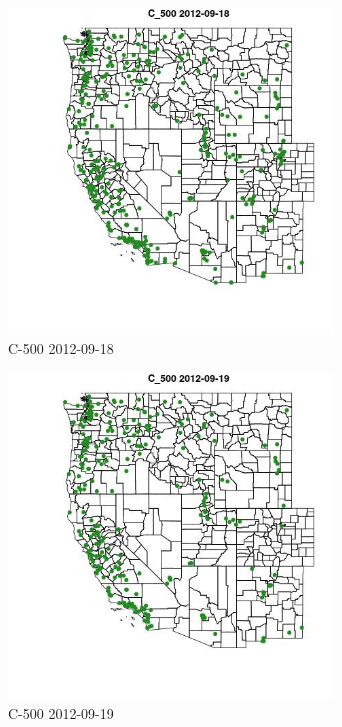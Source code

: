 \begin{figure} 
\centering  
\includegraphics[width=0.77\textwidth]{Code_Outputs/ML_input_report_ML_input_PM25_Step5_part_d_de_duplicated_aves_ML_input_MapObsC_5002012-09-18.jpg} 
\caption{\label{fig:ML_input_report_ML_input_PM25_Step5_part_d_de_duplicated_aves_ML_inputMapObsC_5002012-09-18}C-500 2012-09-18} 
\end{figure} 
 

\begin{figure} 
\centering  
\includegraphics[width=0.77\textwidth]{Code_Outputs/ML_input_report_ML_input_PM25_Step5_part_d_de_duplicated_aves_ML_input_MapObsC_5002012-09-19.jpg} 
\caption{\label{fig:ML_input_report_ML_input_PM25_Step5_part_d_de_duplicated_aves_ML_inputMapObsC_5002012-09-19}C-500 2012-09-19} 
\end{figure} 
 

